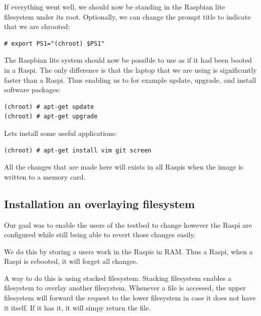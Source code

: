 If everything went well, we should now be standing in the Raspbian lite filesystem
under its root. Optionally, we can change the prompt title to indicate that we
are chrooted:

\begin{lstlisting}[]
# export PS1="(chroot) $PS1"
\end{lstlisting}
\FloatBarrier
\vspace{-5mm}

The Raspbian lite system should now be possible to use as if it had been booted
in a \ac{Raspi}. The only difference is that the laptop that we are using is
significantly faster than a \ac{Raspi}. Thus enabling us to for example update,
upgrade, and install software packages:

\begin{lstlisting}[]
(chroot) # apt-get update
(chroot) # apt-get upgrade
\end{lstlisting}
\FloatBarrier
\vspace{-5mm}

Lets install some useful applications:
\begin{lstlisting}[]
(chroot) # apt-get install vim git screen
\end{lstlisting}
\FloatBarrier
\vspace{-5mm}

All the changes that are made here will exists in all \ac{Raspi}s when the
image is written to a memory card.

\subsection{Installation an overlaying filesystem}

Our goal was to enable the users of the testbed to change however the
\ac{Raspi} are configured while still being able to revert those changes easily.

We do this by storing a users work in the \ac{Raspi}s in \ac{RAM}. Thus a
\ac{Raspi}, when a \ac{Raspi} is rebooted, it will forget all changes.

A way to do this is using stacked filesystem. Stacking filesystem enables
a filesystem to overlay another filesystem. Whenever a file is accessed,
the upper filesystem will forward the request to the lower filesystem in
case it does not have it itself. If it has it, it will simpy return the file.


